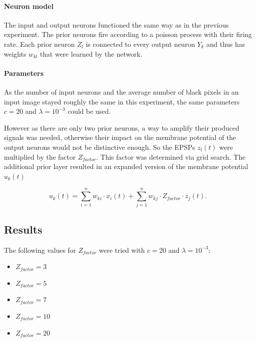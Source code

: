 \paragraph{Neuron model}
The input and output neurons functioned the same way as in the previous experiment. The prior neurons fire according to a poisson process with their firing rate. Each prior neuron $Z_l$ is connected to every output neuron $Y_k$ and thus has weights $w_{kl}$ that were learned by the network. 

\paragraph{Parameters}
As the number of input neurons and the average number of black pixels in an input image stayed roughly the same in this experiment, the same parameters $c=  20$ and $\lambda = 10^{-3}$ could be used.

 However as there are only two prior neurons, a way to amplify their produced signals was needed, otherwise their impact on the membrane potential of the output neurons would not be distinctive enough. So the EPSPs $z_l(t)$ were multiplied by the factor $Z_{factor}$. This factor was determined via grid search. The additional prior layer resulted in an expanded version of the membrane potential $u_k(t)$

\begin{equation}
\label{eqn:ukHorvert}
u_k(t) = \sum_{i=1}^n w_{ki} \cdot x_i(t) + \sum_{j=1}^n w_{kj} \cdot Z_{factor} \cdot z_j(t).
\end{equation}


\subsection{Results} 

The following values for $Z_{factor} $ were tried with $c = 20$ and $\lambda = 10^{-3}$:
\begin{itemize}
  \item $Z_{factor} = 3$
  \item $Z_{factor} = 5$
  \item $Z_{factor} = 7$  
  \item $Z_{factor} = 10$ 
  \item $Z_{factor} = 20$
\end{itemize}

